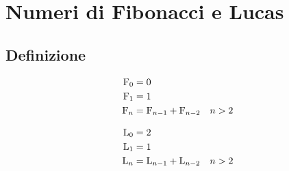 \chapter{Numeri di Fibonacci e Lucas}
\section{Definizione}
\begin{defn}
	\begin{align}
		\mathrm{F}_{0}={}&0\notag\\
		\mathrm{F}_{1}={}&1\notag\\
		\mathrm{F}_{n}={}&\mathrm{F}_{n-1}+\mathrm{F}_{n-2}\quad n>2\label{eqn:Fibodef}
	\end{align}
\end{defn}
\begin{defn}
	\begin{align}
		\mathrm{L}_{0}={}&2\notag\\
		\mathrm{L}_{1}={}&1\notag\\
		\mathrm{L}_{n}={}&\mathrm{L}_{n-1}+\mathrm{L}_{n-2}\quad n>2\label{eqn:Lucadef}
	\end{align}
\end{defn}
